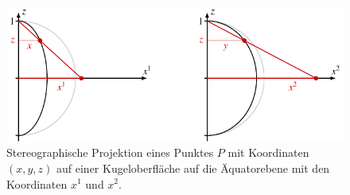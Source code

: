 %
%
%
\begin{figure}
\centering
\includegraphics{chapters/020-koordinaten/images/stereographisch.pdf}
\caption{Stereographische Projektion eines Punktes $P$ mit Koordinaten
$(x,y,z)$ auf einer Kugeloberfläche auf die Äquatorebene mit den
Koordinaten $x^1$ und $x^2$.
\label{buch:koordinaten:diffmannig:fig:stereographisch}}
\end{figure}
